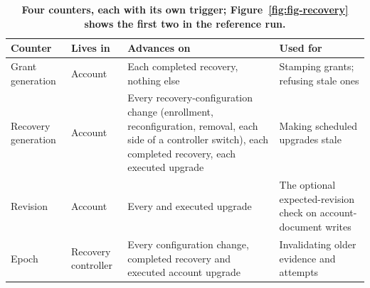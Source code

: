 \begin{table}[tbp]
\centering
\caption{\textbf{Four counters, each with its own trigger; Figure~\ref{fig:fig-recovery} shows the first two in the reference run.} }\label{tab:tab-counters}
\scriptsize\begin{tabularx}{\linewidth}{@{}LLLL@{}}
\toprule
\textbf{Counter} & \textbf{Lives in} & \textbf{Advances on} & \textbf{Used for} \\
\midrule
Grant generation & Account & Each completed recovery, nothing else & Stamping grants; refusing stale ones \\
Recovery generation & Account & Every recovery-configuration change (enrollment, reconfiguration, removal, each side of a controller switch), each completed recovery, each executed upgrade & Making scheduled upgrades stale \\
Revision & Account & Every  and executed upgrade & The optional expected-revision check on account-document writes \\
Epoch & Recovery controller & Every configuration change, completed recovery and executed account upgrade & Invalidating older evidence and attempts \\
\bottomrule
\end{tabularx}
\end{table}
